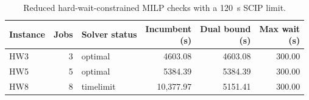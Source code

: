 \begin{table}[tbp]
\caption{Reduced hard-wait-constrained MILP checks with a 120~s SCIP limit.\label{tab:hardwait}}
\centering
\footnotesize
\setlength{\tabcolsep}{3pt}
\begin{tabular*}{\textwidth}{@{\extracolsep{\fill}}lrlrrr@{}}
\toprule
Instance & Jobs & Solver status & \shortstack{Incumbent\\(s)} & \shortstack{Dual bound\\(s)} & \shortstack{Max wait\\(s)}\\
\midrule
HW3 & 3 & optimal & 4603.08 & 4603.08 & 300.00\\
HW5 & 5 & optimal & 5384.39 & 5384.39 & 300.00\\
HW8 & 8 & timelimit & 10,377.97 & 5151.41 & 300.00\\
\bottomrule
\end{tabular*}
\end{table}
